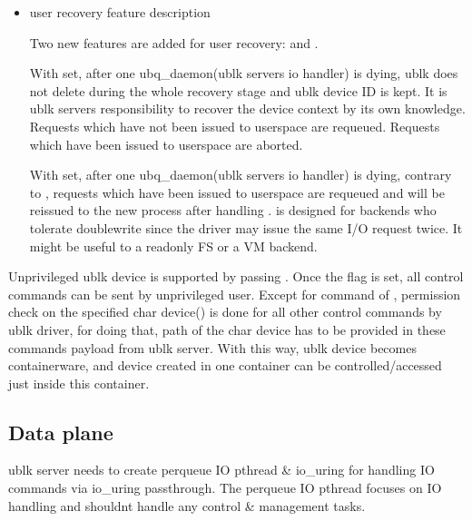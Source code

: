 \documentclass[a4paper,11pt,english]{sphinxmanual}
\begin{document}
\begin{itemize}
\item {} 
user recovery feature description

Two new features are added for user recovery:  and
.

With  set, after one ubq\_daemon(ublk server\textquotesingle{}s io
handler) is dying, ublk does not delete  during the whole
recovery stage and ublk device ID is kept. It is ublk server\textquotesingle{}s
responsibility to recover the device context by its own knowledge.
Requests which have not been issued to userspace are requeued. Requests
which have been issued to userspace are aborted.

With  set, after one ubq\_daemon(ublk
server\textquotesingle{}s io handler) is dying, contrary to ,
requests which have been issued to userspace are requeued and will be
re\sphinxhyphen{}issued to the new process after handling .
 is designed for backends who tolerate
double\sphinxhyphen{}write since the driver may issue the same I/O request twice. It
might be useful to a read\sphinxhyphen{}only FS or a VM backend.

\end{itemize}

Unprivileged ublk device is supported by passing .
Once the flag is set, all control commands can be sent by unprivileged
user. Except for command of , permission check on
the specified char device() is done for all other control
commands by ublk driver, for doing that, path of the char device has to
be provided in these commands\textquotesingle{} payload from ublk server. With this way,
ublk device becomes container\sphinxhyphen{}ware, and device created in one container
can be controlled/accessed just inside this container.


\subsection{Data plane}
\label{\detokenize{ublk:data-plane}}
ublk server needs to create per\sphinxhyphen{}queue IO pthread \& io\_uring for handling IO
commands via io\_uring passthrough. The per\sphinxhyphen{}queue IO pthread
focuses on IO handling and shouldn\textquotesingle{}t handle any control \& management
tasks.
\end{document}
